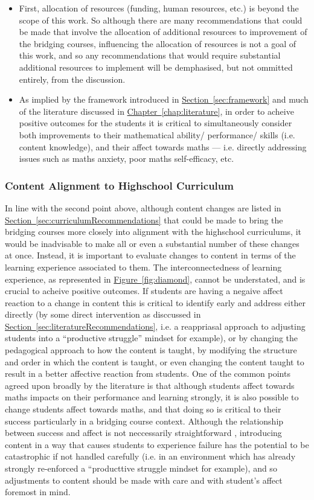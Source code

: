 \documentclass[twoside,12pt,a4paper]{report}
\newcommand{\refchap}[1]{\hyperref[chap:#1]{Chapter~\ref{chap:#1}}}
\newcommand{\refsec}[1]{\hyperref[sec:#1]{Section~\ref{sec:#1}}}
\newcommand{\reffig}[1]{\hyperref[fig:#1]{Figure~\ref{fig:#1}}}
\begin{document}
\begin{itemize}
	\item First, allocation of resources (funding, human resources, etc.) is beyond the scope of this work. So although there are many recommendations that could be made that involve the allocation of additional resources to improvement of the bridging courses, influencing the allocation of resources is not a goal of this work, and so any recommendations that would require substantial additional resources to implement will be demphasised, but not ommitted entirely, from the discussion.
	\item As implied by the framework introduced in \refsec{framework} and much of the literature discussed in \refchap{literature}, in order to acheive positive outcomes for the students it is critical to simultaneously consider both improvements to their mathematical ability/ performance/ skills (i.e. content knowledge), and their affect towards maths --- i.e. directly addressing issues such as maths anxiety, poor maths self-efficacy, etc.
\end{itemize}

\subsubsection{Content Alignment to Highschool Curriculum}

In line with the second point above, although content changes are listed in \refsec{curriculumRecommendations} that could be made to bring the bridging courses more closely into alignment with the highschool curriculums, it would be inadvisable to make all or even a substantial number of these changes at once. Instead, it is important to evaluate changes to content in terms of the learning experience associated to them. The interconnectedness of learning experience, as represented in \reffig{diamond}, cannot be understated, and is crucial to acheive positive outcomes. If students are having a negaive affect reaction to a change in content this is critical to identify early and address either directly (by some direct intervention as disccussed in \refsec{literatureRecommendations}, i.e. a reappriasal approach to adjusting students into a ``productive struggle'' mindset for example), or by changing the pedagogical approach to how the content is taught, by modifying the structure and order in which the content is taught, or even changing the content taught to result in a better affective reaction from students. One of the common points agreed upon broadly by the literature is that although students affect towards maths impacts on their performance and learning strongly, it is also possible to change students affect towards maths, and that doing so is critical to their success particularly in a bridging course context. Although the relationship between success and affect is not neccessarily straightforward \cite{Jansen2013}, introducing content in a way that causes students to experience failure has the potential to be catastrophic if not handled carefully (i.e. in an environment which has already strongly re-enforced a ``producttive struggle mindset for example), and so adjustments to content should be made with care and with student's affect foremost in mind.
\end{document}
